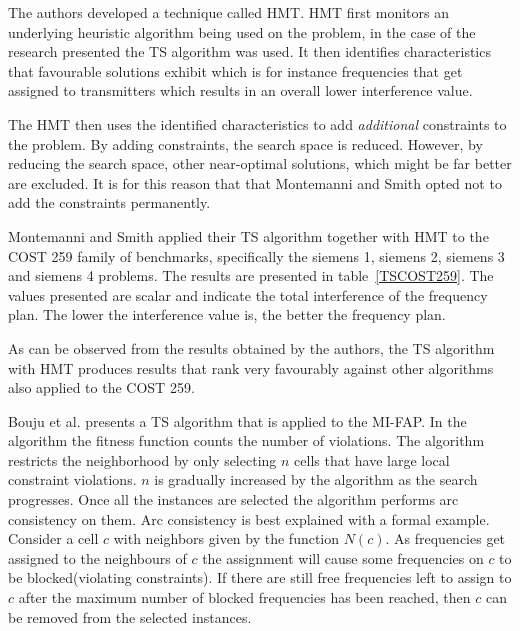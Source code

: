 The authors developed a technique called \gls{HMT}. \Gls{HMT} first monitors an underlying heuristic algorithm being used on the problem, in the case of the research presented the \gls{TS} algorithm was used\cite{TabuMontemanniSmith}. It then identifies characteristics that favourable solutions exhibit which is for instance frequencies that get assigned to transmitters which results in an overall lower interference value\cite{TabuMontemanniSmith}.

The \gls{HMT} then uses the identified characteristics to add \emph{additional} constraints to the problem\cite{TabuMontemanniSmith}. By adding constraints, the search space is reduced. However, by reducing the search space, other near-optimal solutions, which might be far better are excluded\cite{TabuMontemanniSmith}. It is for this reason that that Montemanni and Smith opted not to add the constraints permanently.

Montemanni and Smith applied their \gls{TS} algorithm together with \gls{HMT} to the \gls{COST} 259 family of benchmarks, specifically the siemens 1, siemens 2, siemens 3 and siemens 4 problems. The results are presented in table~\ref{TSCOST259}. The values presented are scalar and indicate the total interference of the frequency plan. The lower the interference value is, the better the frequency plan.

As can be observed from the results obtained by the authors, the \gls{TS} algorithm with HMT produces results that rank very favourably against other algorithms also applied to the \gls{COST} 259. 

Bouju et al. \cite{TSBouju} presents a TS algorithm that is applied to the MI-FAP. In the algorithm the fitness function counts the number of violations. The algorithm restricts the neighborhood by only selecting $n$ cells that have large local constraint violations. $n$ is gradually increased by the algorithm as the search progresses. Once all the instances are selected the algorithm performs arc consistency on them. Arc consistency is best explained with a formal example. Consider a cell $c$ with neighbors given by the function $N(c)$. As frequencies get assigned to the neighbours of $c$ the assignment will cause some frequencies on $c$ to be blocked(violating constraints). If there are still free frequencies left to assign to $c$ after the maximum number of blocked frequencies has been reached, then $c$ can be removed from the selected instances.

